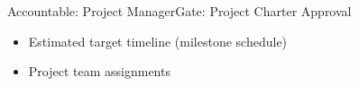 \begin{stagecard}{Accountable: Project Manager}{Gate: Project Charter Approval}
\tcbline
{}\par
\begin{minipage}[t]{0.485\linewidth}
\begin{itemize}[leftmargin=*,itemsep=1pt,topsep=2pt]
  \item Estimated target timeline (milestone schedule)
\end{itemize}
\end{minipage}\hfill
\begin{minipage}[t]{0.485\linewidth}
\begin{itemize}[leftmargin=*,itemsep=1pt,topsep=2pt]
  \item Project team assignments
\end{itemize}
\end{minipage}
\tcbline
{}
\end{stagecard}

